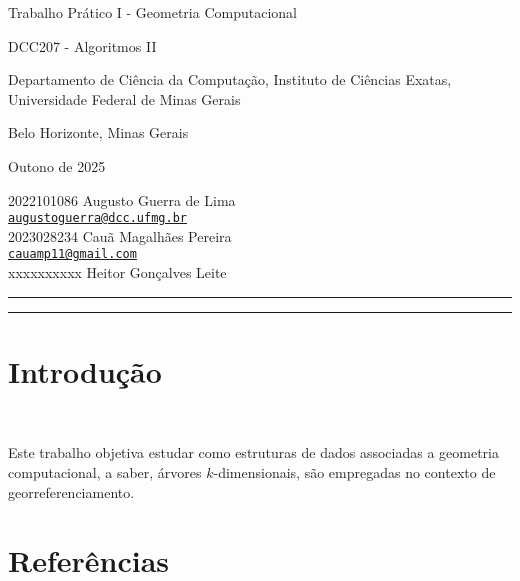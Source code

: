 \documentclass{article}
\begin{document}
\begin{center}
    {
    \Large
    Trabalho Prático I - Geometria Computacional

    DCC207 - Algoritmos II
    
    }

    Departamento de Ciência da Computação, Instituto de Ciências Exatas, Universidade Federal de Minas Gerais

    Belo Horizonte, Minas Gerais

    Outono de 2025
\end{center}

\begin{flushright}
2022101086  Augusto Guerra de Lima\\
\href{mailto:augustoguerra@dcc.ufmg.br}{\texttt{augustoguerra@dcc.ufmg.br}}\\
2023028234  Cauã Magalhães Pereira\\
\href{mailto:cauamp11@gmail.com}{\texttt{cauamp11@gmail.com}} \\
xxxxxxxxxx  Heitor Gonçalves Leite\\
\href{mailto:}{\texttt{}}
\end{flushright}

\hrule
\vspace{.1cm}
\hrule
\begin{adjustwidth}{-1.5cm}{-1.5cm}

\section{Introdução}
\ 

Este trabalho objetiva estudar como estruturas de dados associadas a geometria computacional, a saber, árvores \(k\)-dimensionais, são empregadas no contexto de georreferenciamento.

\section{Referências}

\end{adjustwidth}
\end{document}
